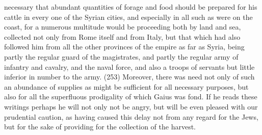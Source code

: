 necessary that abundant quantities of forage and food should be prepared for his cattle in every
one of the Syrian cities, and especially in all such as were on the coast, for a numerous multitude
would be proceeding both by land and sea, collected not only from Rome itself and from Italy, but
that which had also followed him from all the other provinces of the empire as far as Syria, being
partly the regular guard of the magistrates, and partly the regular army of infantry and cavalry, and
the naval force, and also a troops of servants but little inferior in number to the army. (253)
Moreover, there was need not only of such an abundance of supplies as might be sufficient for all
necessary purposes, but also for all the superfluous prodigality of which Gaius was fond. If he
reads these writings perhaps he will not only not be angry, but will be even pleased with our
prudential caution, as having caused this delay not from any regard for the Jews, but for the sake
of providing for the collection of the harvest.

